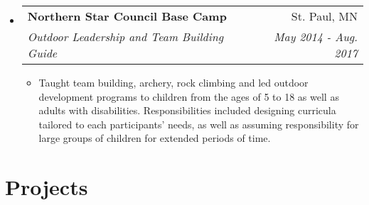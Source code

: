 \documentclass[letterpaper,11pt]{article}
\makeatletter
\newcommand{\resitem}[1]{\item #1 \vspace{-2pt}}
\newcommand{\ressubheading}[4]{
\begin{tabular*}{6.1in}{l@{\extracolsep{\fill}}r}
		\textbf{#1} & #2 \\
		\textit{#3} & \textit{#4} \\
\end{tabular*}\vspace{-1pt}}
\makeatother
\begin{document}
\begin{itemize}
\item
	\ressubheading{Northern Star Council Base Camp}{St. Paul, MN}{Outdoor Leadership and Team Building Guide}{May 2014 - Aug. 2017}
	\begin{itemize}
		\resitem{Taught team building, archery, rock climbing and led outdoor development programs to children from the ages of 5 to 18 as well as adults with disabilities. Responsibilities included designing curricula tailored to each participants' needs, as well as assuming responsibility for large groups of children for extended periods of time.}
	\end{itemize}

\end{itemize}

\section*{Projects}
\end{document}
